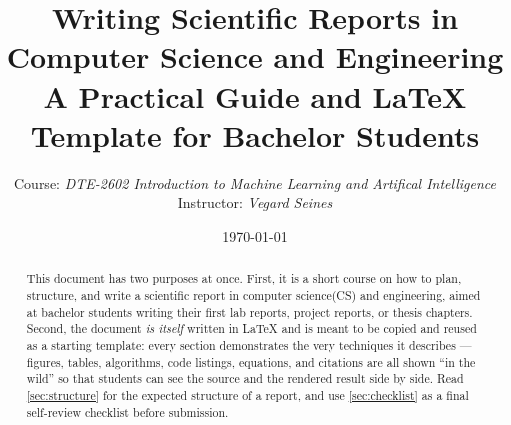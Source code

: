 \documentclass[11pt,a4paper]{article}
\title{%
  \AddToHook{shipout/background}{%
  \ifnum\value{page}=1
    \uitTitleLogo
  \fi
}
  \Large
  \textcolor{uitDarkBlue}{%
    \textbf{Writing Scientific Reports in\\
    Computer Science and Engineering}%
  }
  \\[0.3em]
  \large
  A Practical Guide and \LaTeX{} Template for Bachelor Students
}
\author{
  Course: \emph{DTE-2602 Introduction to Machine Learning and Artifical Intelligence}\\
  Instructor: \emph{Vegard Seines}
}
\date{\today}
\begin{document}
\maketitle

\begin{abstract}
This document has two purposes at once. First, it is a short course on how to
plan, structure, and write a scientific report in computer science(CS) and
engineering, aimed at bachelor students writing their first lab reports,
project reports, or thesis chapters. Second, the document \emph{is itself}
written in \LaTeX{} and is meant to be copied and reused as a starting
template: every section demonstrates the very techniques it describes ---
figures, tables, algorithms, code listings, equations, and citations are
all shown ``in the wild'' so that students can see the source and the
rendered result side by side. Read \cref{sec:structure} for the expected
structure of a report, and use \cref{sec:checklist} as a final
self-review checklist before submission.
\end{abstract}

\newpage
\tableofcontents
\thispagestyle{fancy}
\newpage


\newpage

\newpage

\newpage

\newpage

\newpage

\newpage

\newpage

\newpage

\newpage



\end{document}

